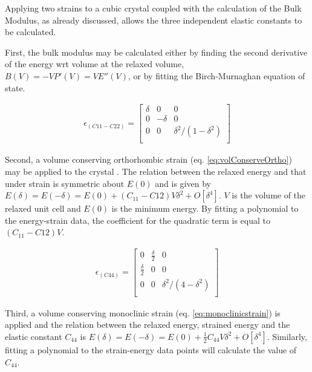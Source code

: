 Applying two strains to a cubic crystal \cite{pressuredepmehl} coupled with the calculation of the Bulk Modulus, as already discussed, allows the three independent elastic constants to be calculated.

First, the bulk modulus may be calculated either by finding the second derivative of the energy wrt volume at the relaxed volume, $B(V) = -V P'(V) = V E''(V)$\cite{pressuredepmehl}, or by fitting the Birch-Murnaghan equation of state.

\begin{equation}
  \begin{split}
    \epsilon_{(C11 - C22)} = 
    \begin{bmatrix}
    \delta & 0 & 0   \\
    0 & - \delta & 0   \\
    0 & 0 & \delta^2 / (1 - \delta^2)   \\
    \end{bmatrix}
  \end{split}
  \label{eq:volConserveOrtho}
\end{equation}

Second, a volume conserving orthorhombic strain (eq. \ref{eq:volConserveOrtho}) may be applied to the crystal \cite{pressuredepmehl}.  The relation between the relaxed energy and that under strain is symmetric about $E(0)$ and is given by $E(\delta) = E(-\delta) = E(0) + (C_{11} - C{12}) V \delta^2 + O[\delta^4]$\cite{pressuredepmehl}.  $V$ is the volume of the relaxed unit cell and $E(0)$ is the minimum energy.  By fitting a polynomial to the energy-strain data, the coefficient for the quadratic term is equal to $(C_{11} - C{12}) V$.

  \begin{equation}
    \begin{split}
      \epsilon_{(C44)} = 
      \begin{bmatrix}
      0 & \frac{\delta}{2} & 0   \\
       \frac{\delta}{2} & 0 & 0   \\
      0 & 0 & \delta^2 / (4 - \delta^2)   \\
      \end{bmatrix}
    \end{split}
    \label{eq:monoclinicstrain}
  \end{equation}

Third, a volume conserving monoclinic strain (eq. \ref{eq:monoclinicstrain}) is applied and the relation between the relaxed energy, strained energy and the elastic constant $C_{44}$ is $E(\delta) = E(-\delta) = E(0) + \frac{1}{2} C_{44} V \delta^2 + O[\delta^4]$.  Similarly, fitting a polynomial to the strain-energy data points will calculate the value of $C_{44}$.

